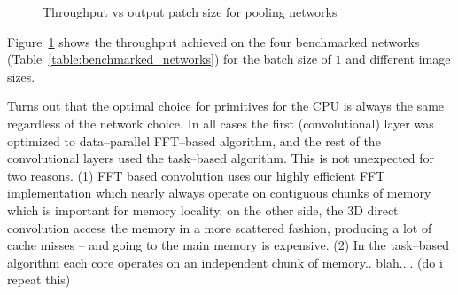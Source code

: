 \documentclass[conference]{./IEEEtran/IEEEtran}
\begin{document}
  \begin{figure}[!htbp]
    \centering %

    \caption{Throughput vs output patch size for pooling networks
    }
    \label{fig:experiments1}
  \end{figure}



  Figure~\ref{fig:experiments1} shows the throughput achieved on the
  four benchmarked networks (Table~\ref{table:benchmarked_networks})
  for the batch size of $1$ and different image sizes.

  Turns out that the optimal choice for primitives for the CPU is
  always the same regardless of the network choice.  In all cases the
  first (convolutional) layer was optimized to data--parallel
  FFT--based algorithm, and the rest of the convolutional layers used
  the task--based algorithm.  This is not unexpected for two
  reasons. (1) FFT based convolution uses our highly efficient FFT
  implementation which nearly always operate on contiguous chunks of
  memory which is important for memory locality, on the other side,
  the 3D direct convolution access the memory in a more scattered
  fashion, producing a lot of cache misses -- and going to the main
  memory is expensive. (2) In the task--based algorithm each core
  operates on an independent chunk of memory.. blah.... (do i repeat
  this)
\end{document}
